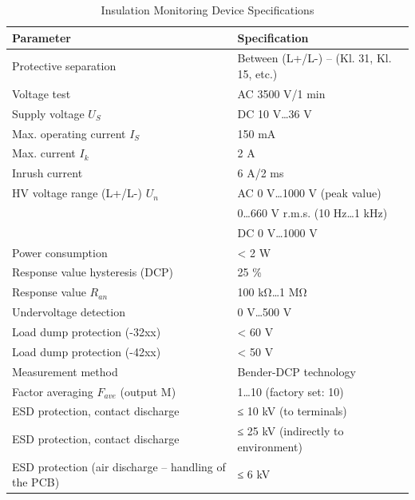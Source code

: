 \begin{table}[H]
    \centering
    \caption{Insulation Monitoring Device Specifications}
    \label{tab:table1}
    \begin{adjustbox}{width=\textwidth}
    \begin{tabular}{|l|l|}
        \hline
        \textbf{Parameter} & \textbf{Specification} \\
        \hline
        Protective separation & Between (L+/L-) – (Kl. 31, Kl. 15, etc.) \\
        Voltage test & AC 3500 V/1 min \\
        Supply voltage \(U_S\) & DC 10 V…36 V \\
        Max. operating current \(I_S\) & 150 mA \\
        Max. current \(I_k\) & 2 A \\
        Inrush current & 6 A/2 ms \\
        HV voltage range (L+/L-) \(U_n\) & AC 0 V…1000 V (peak value) \\
        & 0…660 V r.m.s. (10 Hz…1 kHz) \\
        & DC 0 V…1000 V \\
        Power consumption & < 2 W \\
        Response value hysteresis (DCP) & 25 \% \\
        Response value \(R_{an}\) & 100 kΩ…1 MΩ \\
        Undervoltage detection & 0 V…500 V \\
        Load dump protection (-32xx) & < 60 V \\
        Load dump protection (-42xx) & < 50 V \\
        Measurement method & Bender-DCP technology \\
        Factor averaging \(F_{ave}\) (output M) & 1…10 (factory set: 10) \\
        ESD protection, contact discharge   & ≤ 10 kV (to terminals)\\
        ESD protection, contact discharge  & ≤ 25 kV (indirectly to environment) \\
        ESD protection (air discharge – handling of the PCB) & ≤ 6 kV \\
        \hline
    \end{tabular}
    \end{adjustbox}
\end{table}


